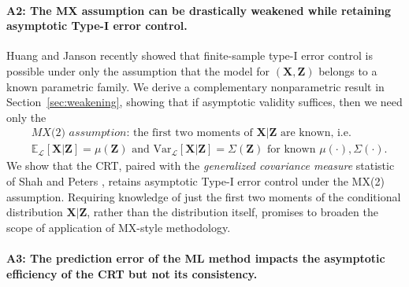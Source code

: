 \documentclass[12pt]{article}
\theoremstyle{definition}
\theoremstyle{remark}
\newcommand{\prx}{\bm X}
\newcommand{\prz}{\bm Z}
\begin{document}
\paragraph{A2: The MX assumption can be drastically weakened while retaining asymptotic Type-I error control.}
Huang and Janson \cite{Huang2019} recently showed that finite-sample type-I error control is possible under only the assumption that the model for $(\prx, \prz)$ belongs to a known parametric family. We derive a complementary nonparametric result in Section~\ref{sec:weakening}, showing that if asymptotic validity suffices, then we need only the 
\begin{equation}
\begin{split}
&\textit{MX(2) assumption:} \text{ the first two moments of $\prx|\prz$ are known, i.e.} \\
&\mathbb E_{\mathcal L}[\prx|\prz] = \mu(\prz) \text{ and } \text{Var}_{\mathcal L}[\prx|\prz] = \Sigma(\prz) \text{ for known } \mu(\cdot), \Sigma(\cdot).
\label{MX(2)-intro}
\end{split}
\end{equation}
We show that the CRT, paired with the \textit{generalized covariance measure} statistic of Shah and Peters \cite{Shah2018}, retains asymptotic Type-I error control under the MX(2) assumption. Requiring knowledge of just the first two moments of the conditional distribution $\prx|\prz$, rather than the distribution itself, promises to broaden the scope of application of MX-style methodology.


\paragraph{A3: The prediction error of the ML method impacts the asymptotic efficiency of the CRT but not its consistency.}
\end{document}
